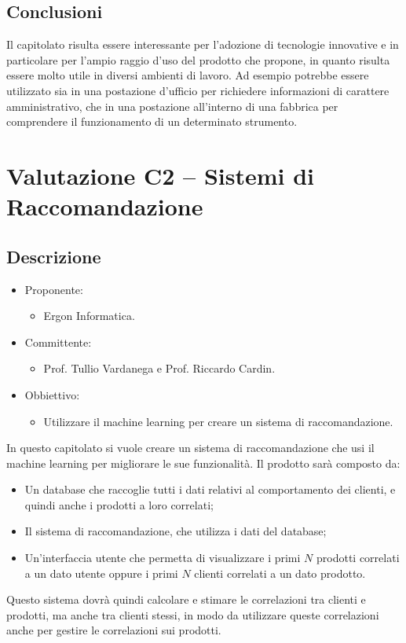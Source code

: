 \documentclass[a4paper, twoside]{article}
\begin{document}
        \subsection{Conclusioni}
        Il capitolato risulta essere interessante per l'adozione di tecnologie innovative e in particolare per l'ampio raggio d'uso del prodotto che propone, in quanto risulta essere molto utile in diversi ambienti di lavoro. Ad esempio potrebbe essere utilizzato sia in una postazione d'ufficio per richiedere informazioni di carattere amministrativo, che in una postazione all'interno di una fabbrica per comprendere il funzionamento di un determinato strumento.

    \section{Valutazione C2 -- Sistemi di Raccomandazione}
        \subsection{Descrizione}
            \begin{itemize}
                \item Proponente:
                \begin{itemize}
                    \item Ergon Informatica.
                \end{itemize}
                \item Committente:
                \begin{itemize}
                    \item Prof. Tullio Vardanega e Prof.
                    Riccardo Cardin.
                \end{itemize}
                \item Obbiettivo:
                \begin{itemize}
                    \item Utilizzare il machine learning per creare un sistema di raccomandazione.
                \end{itemize}
            \end{itemize}
            In questo capitolato si vuole creare un sistema di raccomandazione che usi il machine learning per migliorare le sue funzionalità. Il prodotto sarà composto da:
            \begin{itemize}
                \item Un database che raccoglie tutti i dati relativi al comportamento dei clienti, e quindi anche i prodotti a loro correlati;
                \item Il sistema di raccomandazione, che utilizza i dati del database;
                \item Un'interfaccia utente che permetta di visualizzare i primi $N$ prodotti correlati a un dato utente oppure i primi $N$ clienti correlati a un dato prodotto.
            \end{itemize}
            Questo sistema dovrà quindi calcolare e stimare le correlazioni tra clienti e prodotti, ma anche tra clienti stessi, in modo da utilizzare queste correlazioni anche per gestire le correlazioni sui prodotti.
\end{document}
